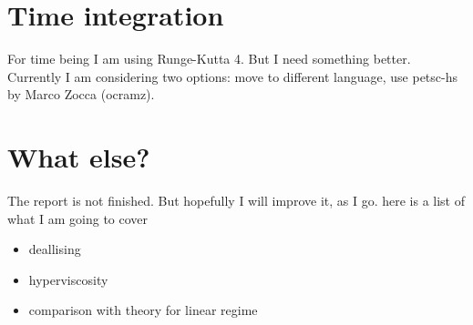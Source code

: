 \documentclass[preprint,aip,pop]{article}
\begin{document}
\section {Time integration}
For time being I am using Runge-Kutta 4. But I need something better. Currently I
am considering two options: move to different language, use petsc-hs by 
 Marco Zocca (ocramz).

\section{What else?}
The report is not finished.
But hopefully I will improve it, as I go.
here is a list of what I am going to cover
\begin{itemize}
\item deallising
\item hyperviscosity
\item comparison with theory for linear regime
\end{itemize}


 
\end{document}
